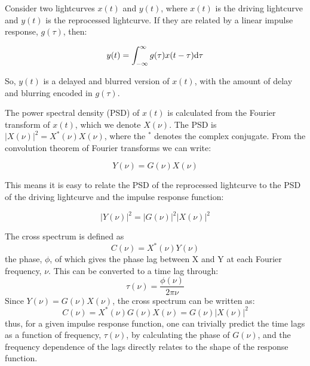 \documentclass[11pt,letterpaper]{article}
\begin{document}
Consider two lightcurves $x(t)$ and $y(t)$, where $x(t)$ is the driving lightcurve and $y(t)$ is the reprocessed lightcurve.  If they are related by a linear impulse response, $g(\tau)$, then: 

\begin{equation}
y(t) = \int_{-\infty}^{\infty} g(\tau) x(t-\tau)  {\rm d}\tau
\end{equation} 

So, $y(t)$ is a delayed and blurred version of $x(t)$, with the amount of delay and blurring encoded in $g(\tau)$.

The power spectral density (PSD) of $x(t)$ is calculated from the Fourier transform of $x(t)$, which we denote $X(\nu)$.  The PSD is $|X(\nu)|^2 = X^*(\nu)X(\nu)$, where the $^*$ denotes the complex conjugate.  From the convolution theorem of Fourier transforms we can write:

\begin{equation}
Y(\nu) = G(\nu) X(\nu)
\end{equation}

This means it is easy to relate the PSD of the reprocessed lightcurve to the PSD of the driving lightcurve and the impulse response function:

\begin{equation}
|Y(\nu)|^2 = |G(\nu)|^2 |X(\nu)|^2
\end{equation}

The cross spectrum is defined as
\begin{equation}
C(\nu) = X^*(\nu) Y(\nu)
\end{equation}
the phase, $\phi$, of which gives the phase lag between X and Y at each Fourier frequency, $\nu$.  This can be converted to a time lag through: 
\begin{equation}
\tau(\nu) = \frac{\phi(\nu)}{2\pi\nu}
\end{equation}
Since $Y(\nu) = G(\nu) X(\nu)$,  the cross spectrum can be written as:
\begin{equation}
C(\nu) = X^*(\nu) G(\nu) X(\nu) =  G(\nu) |X(\nu)|^2 
\end{equation}
thus, for a given impulse response function, one can trivially predict the time lags as a function of frequency, $\tau(\nu)$, by calculating the phase of $G(\nu)$, and the frequency dependence of the lags directly relates to the shape of the response function.
\end{document}
